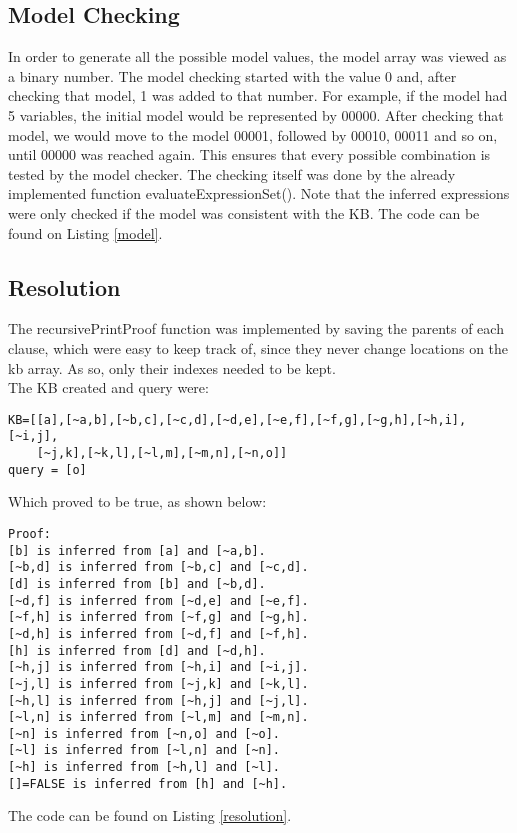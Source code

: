 \documentclass{article}
\begin{document}
\subsection*{Model Checking}
In order to generate all the possible model values, the model array was viewed as a binary number. The model checking started with the value 0 and, after checking that model, 1 was added to that number. For example, if the model had 5 variables, the initial model would be represented by 00000. After checking that model, we would move to the model 00001, followed by 00010, 00011 and so on, until 00000 was reached again. This ensures that every possible combination is tested by the model checker. The checking itself was done by the already implemented function evaluateExpressionSet(). Note that the inferred expressions were only checked if the model was consistent with the KB. The code can be found on Listing \ref{model}.

\subsection*{Resolution}
The recursivePrintProof function was implemented by saving the parents of each clause, which were easy to keep track of, since they never change locations on the kb array. As so, only their indexes needed to be kept.\\
The KB created and query were:
\begin{lstlisting}
KB=[[a],[~a,b],[~b,c],[~c,d],[~d,e],[~e,f],[~f,g],[~g,h],[~h,i],[~i,j],
    [~j,k],[~k,l],[~l,m],[~m,n],[~n,o]]
query = [o]
\end{lstlisting}
Which proved to be true, as shown below:\\
\begin{lstlisting}
Proof:
[b] is inferred from [a] and [~a,b].
[~b,d] is inferred from [~b,c] and [~c,d].
[d] is inferred from [b] and [~b,d].
[~d,f] is inferred from [~d,e] and [~e,f].
[~f,h] is inferred from [~f,g] and [~g,h].
[~d,h] is inferred from [~d,f] and [~f,h].
[h] is inferred from [d] and [~d,h].
[~h,j] is inferred from [~h,i] and [~i,j].
[~j,l] is inferred from [~j,k] and [~k,l].
[~h,l] is inferred from [~h,j] and [~j,l].
[~l,n] is inferred from [~l,m] and [~m,n].
[~n] is inferred from [~n,o] and [~o].
[~l] is inferred from [~l,n] and [~n].
[~h] is inferred from [~h,l] and [~l].
[]=FALSE is inferred from [h] and [~h].
\end{lstlisting}
The code can be found on Listing \ref{resolution}.
\end{document}
